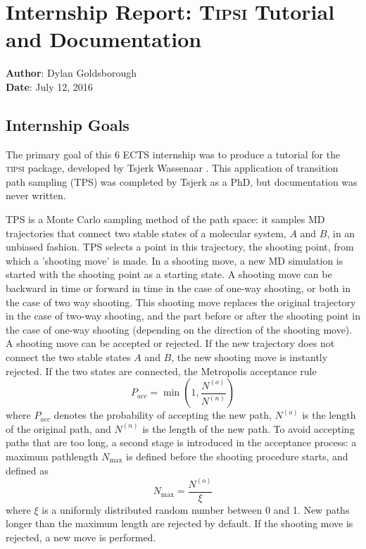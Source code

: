 \documentclass[]{article}
\begin{document}
\section*{Internship Report: \textsc{Tipsi} Tutorial and Documentation}
\textbf{Author}: Dylan Goldsborough\\
\textbf{Date}: July 12, 2016

\subsection*{Internship Goals}

The primary goal of this 6 ECTS internship was to produce a tutorial for the \textsc{tipsi} package, developed by Tsjerk Wassenaar \cite{tipsi}. This application of transition path sampling (TPS) was completed by Tsjerk as a PhD, but documentation was never written. 

TPS is a Monte Carlo sampling method of the path space: it samples MD trajectories that connect two stable states of a molecular system, $A$ and $B$, in an unbiased fashion. TPS selects a point in this trajectory, the shooting point, from which a 'shooting move' is made. In a shooting move, a new MD simulation is started with the shooting point as a starting state. A shooting move can be backward in time or forward in time in the case of one-way shooting, or both in the case of two way shooting. This shooting move replaces the original trajectory in the case of two-way shooting, and the part before or after the shooting point in the case of one-way shooting (depending on the direction of the shooting move). A shooting move can be accepted or rejected. If the new trajectory does not connect the two stable states $A$ and $B$, the new shooting move is instantly rejected. If the two states are connected, the Metropolis acceptance rule
%
\begin{equation}
P_{acc}=\min(1, \frac{N^{(o)}}{N^{(n)}})
\end{equation}
%
where $P_{acc}$ denotes the probability of accepting the new path, $N^{(o)}$ is the length of the original path, and $N^{(n)}$ is the length of the new path. To avoid accepting paths that are too long, a second stage is introduced in the acceptance process: a maximum pathlength $N_{\mathrm{max}}$ is defined before the shooting procedure starts, and defined as
%
\begin{equation}
N_{\mathrm{max}} = \frac{N^{(o)}}{\xi}
\end{equation}
%
where $\xi$ is a uniformly distributed random number between 0 and 1. New paths longer than the maximum length are rejected by default. If the shooting move is rejected, a new move is performed.
\end{document}
